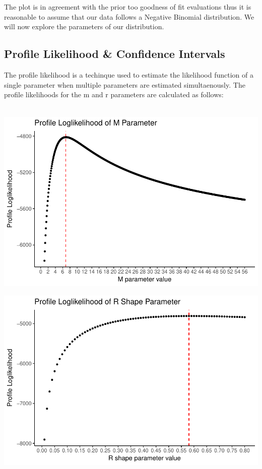 \documentclass[11pt,preprint, authoryear]{elsarticle}
\numberwithin{equation}{section}
\numberwithin{figure}{section}
\numberwithin{table}{section}
\begin{document}
The plot is in agreement with the prior too goodness of fit evaluations
thus it is reasonable to assume that our data follows a Negative
Binomial distribution. We will now explore the parameters of our
distribution.

\subsection{Profile Likelihood \& Confidence
Intervals}\label{profile-likelihood-confidence-intervals}

The profile likelihood is a techinque used to estimate the likelihood
function of a single parameter when multiple parameters are estimated
simultaenously. The profile likelihoods for the m and r parameters are
calculated as follows:

\begin{align*}
\end{align*}

\includegraphics{likelihood_files/figure-latex/profile_likelihood_m-1.pdf}

\includegraphics{likelihood_files/figure-latex/profile_likelihood_r-1.pdf}
\end{document}
